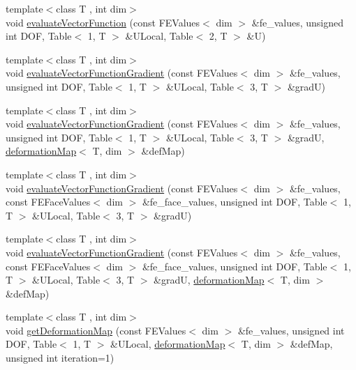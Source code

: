 \begin{DoxyCompactItemize}
\item 
{\footnotesize template$<$class T , int dim$>$ }\\void \mbox{\hyperlink{group___evaluation_functions_gab9e164be1be244df81c932426a4bd513}{evaluate\+Vector\+Function}} (const F\+E\+Values$<$ dim $>$ \&fe\+\_\+values, unsigned int D\+OF, Table$<$ 1, T $>$ \&U\+Local, Table$<$ 2, T $>$ \&U)
\item 
{\footnotesize template$<$class T , int dim$>$ }\\void \mbox{\hyperlink{group___evaluation_functions_ga84eb2ee714466f113c96fcf6a9fd23e8}{evaluate\+Vector\+Function\+Gradient}} (const F\+E\+Values$<$ dim $>$ \&fe\+\_\+values, unsigned int D\+OF, Table$<$ 1, T $>$ \&U\+Local, Table$<$ 3, T $>$ \&gradU)
\item 
{\footnotesize template$<$class T , int dim$>$ }\\void \mbox{\hyperlink{group___evaluation_functions_ga5adf8aa2d91dbdf393aa91dcc65e42e8}{evaluate\+Vector\+Function\+Gradient}} (const F\+E\+Values$<$ dim $>$ \&fe\+\_\+values, unsigned int D\+OF, Table$<$ 1, T $>$ \&U\+Local, Table$<$ 3, T $>$ \&gradU, \mbox{\hyperlink{structdeformation_map}{deformation\+Map}}$<$ T, dim $>$ \&def\+Map)
\item 
{\footnotesize template$<$class T , int dim$>$ }\\void \mbox{\hyperlink{group___evaluation_functions_gab2771d18ff704decbbc12ca2b848bbfe}{evaluate\+Vector\+Function\+Gradient}} (const F\+E\+Values$<$ dim $>$ \&fe\+\_\+values, const F\+E\+Face\+Values$<$ dim $>$ \&fe\+\_\+face\+\_\+values, unsigned int D\+OF, Table$<$ 1, T $>$ \&U\+Local, Table$<$ 3, T $>$ \&gradU)
\item 
{\footnotesize template$<$class T , int dim$>$ }\\void \mbox{\hyperlink{group___evaluation_functions_ga9608539d601a91aff1ba01ccc720fbe0}{evaluate\+Vector\+Function\+Gradient}} (const F\+E\+Values$<$ dim $>$ \&fe\+\_\+values, const F\+E\+Face\+Values$<$ dim $>$ \&fe\+\_\+face\+\_\+values, unsigned int D\+OF, Table$<$ 1, T $>$ \&U\+Local, Table$<$ 3, T $>$ \&gradU, \mbox{\hyperlink{structdeformation_map}{deformation\+Map}}$<$ T, dim $>$ \&def\+Map)
\item 
{\footnotesize template$<$class T , int dim$>$ }\\void \mbox{\hyperlink{group___evaluation_functions_ga62b026b5bcee0bda21159ff6782b4b59}{get\+Deformation\+Map}} (const F\+E\+Values$<$ dim $>$ \&fe\+\_\+values, unsigned int D\+OF, Table$<$ 1, T $>$ \&U\+Local, \mbox{\hyperlink{structdeformation_map}{deformation\+Map}}$<$ T, dim $>$ \&def\+Map, unsigned int iteration=1)

\end{DoxyCompactItemize}
